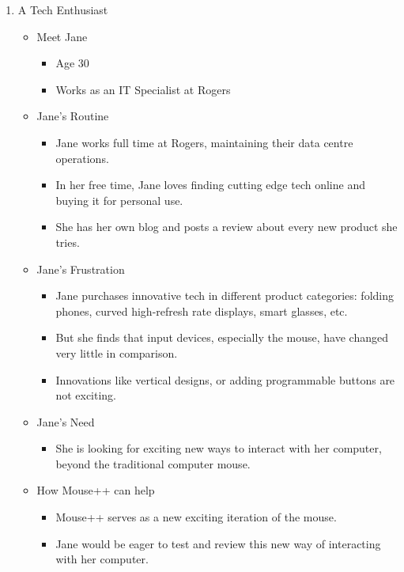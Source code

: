 \documentclass{article}
\begin{document}
\begin{enumerate}
    \item A Tech Enthusiast  
    \begin{itemize}
      \item Meet Jane
      \begin{itemize}
        \item Age 30  
        \item Works as an IT Specialist at Rogers
      \end{itemize}

      \item Jane's Routine
      \begin{itemize}
        \item Jane works full time at Rogers, maintaining their data centre operations.
        \item In her free time, Jane loves finding cutting edge tech online and buying it for personal use.
        \item She has her own blog and posts a review about every new product she tries.
      \end{itemize}

      \item Jane's Frustration
      \begin{itemize}
        \item Jane purchases innovative tech in different product categories: folding phones, curved high-refresh rate displays, smart glasses, etc.
        \item But she finds that input devices, especially the mouse, have changed very little in comparison.
        \item Innovations like vertical designs, or adding programmable buttons are not exciting.
      \end{itemize}

      \item Jane's Need
      \begin{itemize}
        \item She is looking for exciting new ways to interact with her computer, beyond the traditional computer mouse. 
      \end{itemize}

      \item How Mouse++ can help
      \begin{itemize}
        \item Mouse++ serves as a new exciting iteration of the mouse. 
        \item Jane would be eager to test and review this new way of interacting with her computer.
      \end{itemize}
      
    \end{itemize}
    
  \end{enumerate}
  
\end{document}
